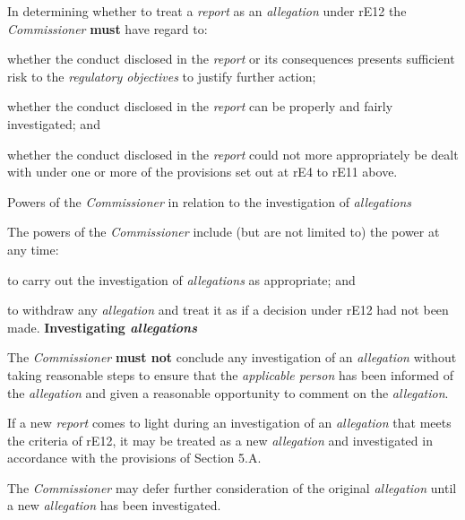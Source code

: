 In determining whether to treat a \emph{report }as
an \emph{allegation} under rE12 the \emph{Commissioner}  \textcolor{myred}{\textbf{must}} have regard
to:\\\nl \item whether the conduct disclosed in the \emph{report} or its
consequences presents sufficient risk to the \emph{regulatory
objectives} to justify further action;
\item whether the conduct disclosed in the \emph{report} can be properly
and fairly investigated; and
\item whether the conduct disclosed in the \emph{report} could not more
appropriately be dealt with under one or more of the provisions set out
at rE4 to rE11 above.\ln
{}\par
Powers of the \emph{Commissioner} in relation to the investigation
of \emph{allegations}\par
{}\par
The powers of the \emph{Commissioner} include (but are not limited to)
the power at any time:\\\nl \item to carry out the investigation of \emph{allegations} as appropriate;
and\item to withdraw any \emph{allegation} and treat it as if a decision under
rE12 had not been made.\ln
\textbf{Investigating \emph{allegations}}\par
{}\par
The \emph{Commissioner}  \textcolor{myred}{\textbf{must not}} conclude any investigation of
an \emph{allegation} without taking reasonable steps to ensure that
the \emph{applicable person} has been informed of
the \emph{allegation} and given a reasonable opportunity to comment on
the \emph{allegation}.\\
\par
If a new \emph{report} comes to light during an investigation of
an \emph{allegation} that meets the criteria of rE12, it may be treated
as a new \emph{allegation} and investigated in accordance with the
provisions of Section 5.A.\\
\par
The \emph{Commissioner} may defer further consideration of the
original \emph{allegation} until a new \emph{allegation} has been
investigated.\\
\par
